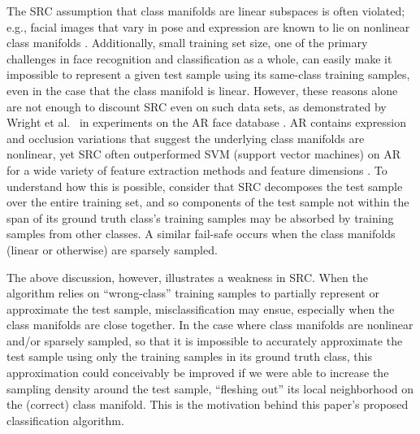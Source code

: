 \documentclass[review]{elsarticle}
\begin{document}
The SRC assumption that class manifolds are linear subspaces is often violated; e.g., facial images that vary in pose and expression are known to lie on nonlinear class manifolds \cite{row:lle,he:lapface}. Additionally, small training set size, one of the primary challenges in face recognition and classification as a whole, can easily make it impossible to represent a given test sample using its same-class training samples, even in the case that the class manifold is linear. However, these reasons alone are not enough to discount SRC even on such data sets, as demonstrated by Wright et al.\ \cite{wri:src} in experiments on the AR face database \cite{AR:face}. AR contains expression and occlusion variations that suggest the underlying class manifolds are nonlinear, yet SRC often outperformed SVM (support vector machines) on AR for a wide variety of feature extraction methods and feature dimensions \cite{wri:src}. To understand how this is possible, consider that SRC decomposes the test sample over the entire training set, and so components of the test sample not within the span of its ground truth class's training samples may be absorbed by training samples from other classes. A similar fail-safe occurs when the class manifolds (linear or otherwise) are sparsely sampled. 

The above discussion, however, illustrates a weakness in SRC. When the algorithm relies on ``wrong-class'' training samples to partially represent or approximate the test sample, misclassification may ensue, especially when the class manifolds are close together. In the case where class manifolds are nonlinear and/or sparsely sampled, so that it is impossible to accurately approximate the test sample using only the training samples in its ground truth class, this approximation could conceivably be improved if we were able to increase the sampling density around the test sample, ``fleshing out'' its local neighborhood on the (correct) class manifold. This is the motivation behind this paper's proposed classification algorithm.
\end{document}
